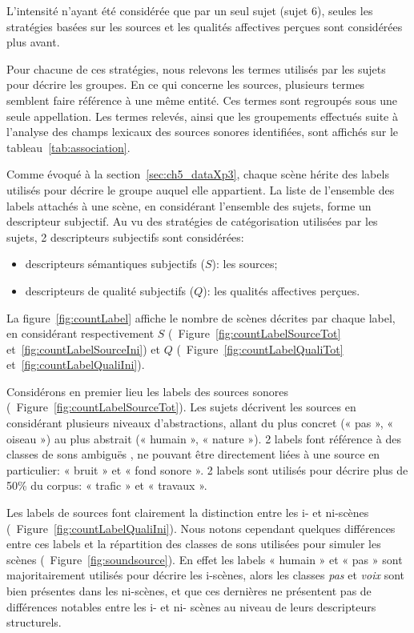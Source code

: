 L'intensité n'ayant été considérée que par un seul sujet (sujet 6), seules les stratégies basées sur les sources et les qualités affectives perçues sont considérées plus avant.

Pour chacune de ces stratégies, nous relevons les termes utilisés par les sujets pour décrire les groupes. En ce qui concerne les sources, plusieurs termes semblent faire référence à une même entité. Ces termes sont regroupés sous une seule appellation. Les termes relevés, ainsi que les groupements effectués suite à l'analyse des champs lexicaux des sources sonores identifiées, sont affichés sur le tableau~\ref{tab:association}.

Comme évoqué à la section~\ref{sec:ch5_dataXp3}, chaque scène hérite des labels utilisés pour décrire le groupe auquel elle appartient. La liste de l'ensemble des labels attachés à une scène, en considérant l'ensemble des sujets, forme un descripteur subjectif. Au vu des stratégies de catégorisation utilisées par les sujets, 2 descripteurs subjectifs sont considérées:

\begin{itemize}
\item descripteurs sémantiques subjectifs ($S$): les sources;
\item descripteurs de qualité subjectifs ($Q$): les qualités affectives perçues.
\end{itemize}

La figure~\ref{fig:countLabel} affiche le nombre de scènes décrites par chaque label, en considérant respectivement $S$ (\cf~Figure~\ref{fig:countLabelSourceTot} et~\ref{fig:countLabelSourceIni}) et $Q$ (\cf~Figure~\ref{fig:countLabelQualiTot} et~\ref{fig:countLabelQualiIni}).

Considérons en premier lieu les labels des sources sonores (\cf~Figure~\ref{fig:countLabelSourceTot}). Les sujets décrivent les sources en considérant plusieurs niveaux d'abstractions, allant du plus concret (« pas », « oiseau ») au plus abstrait (« humain », « nature »). 2 labels font référence à des classes de sons ambiguës , ne pouvant être directement liées à une source en particulier: « bruit » et « fond sonore ». 2 labels sont utilisés pour décrire plus de 50\% du corpus: « trafic » et « travaux ». 

Les labels de sources font clairement la distinction entre les i- et ni-scènes (\cf~Figure~\ref{fig:countLabelQualiIni}). Nous notons cependant quelques différences entre ces labels et la répartition des classes de sons utilisées pour simuler les scènes (\cf~Figure~\ref{fig:soundsource}). En effet les labels « humain » et « pas » sont majoritairement utilisés pour décrire les i-scènes, alors les classes \emph{pas} et \emph{voix} sont bien présentes dans les ni-scènes, et que ces dernières ne présentent pas de différences notables entre les i- et ni- scènes au niveau de leurs descripteurs structurels. 

